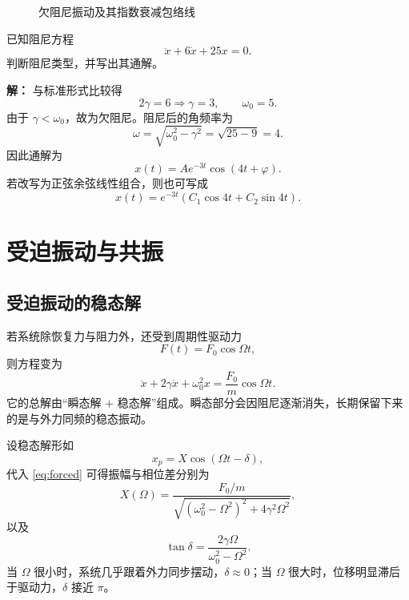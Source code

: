 \begin{figure}[htbp]
\centering
{}
\caption{欠阻尼振动及其指数衰减包络线}
\end{figure}

\begin{example}
已知阻尼方程
\[
\ddot x+6\dot x+25x=0.
\]
判断阻尼类型，并写出其通解。

\textbf{解：} 与标准形式比较得
\[
2\gamma=6\Rightarrow \gamma=3,
\qquad
\omega_0=5.
\]
由于 $\gamma<\omega_0$，故为欠阻尼。阻尼后的角频率为
\[
\omega=\sqrt{\omega_0^2-\gamma^2}=\sqrt{25-9}=4.
\]
因此通解为
\[
x(t)=A e^{-3t}\cos(4t+\varphi).
\]
若改写为正弦余弦线性组合，则也可写成
\[
x(t)=e^{-3t}(C_1\cos4t+C_2\sin4t).
\]
\end{example}

\section{受迫振动与共振}

\subsection{受迫振动的稳态解}

若系统除恢复力与阻力外，还受到周期性驱动力
\[
F(t)=F_0\cos\Omega t,
\]
则方程变为
\begin{equation}
\ddot x+2\gamma\dot x+\omega_0^2x=\frac{F_0}{m}\cos\Omega t.
\label{eq:forced}
\end{equation}
它的总解由“瞬态解 $+$ 稳态解”组成。瞬态部分会因阻尼逐渐消失，长期保留下来的是与外力同频的稳态振动。

设稳态解形如
\[
x_p=X\cos(\Omega t-\delta),
\]
代入 \eqref{eq:forced} 可得振幅与相位差分别为
\begin{equation}
X(\Omega)=\frac{F_0/m}{\sqrt{(\omega_0^2-\Omega^2)^2+4\gamma^2\Omega^2}},
\label{eq:forced-amplitude}
\end{equation}
以及
\begin{equation}
\tan\delta=\frac{2\gamma\Omega}{\omega_0^2-\Omega^2}.
\label{eq:forced-phase}
\end{equation}
当 $\Omega$ 很小时，系统几乎跟着外力同步摆动，$\delta\approx 0$；当 $\Omega$ 很大时，位移明显滞后于驱动力，$\delta$ 接近 $\pi$。


